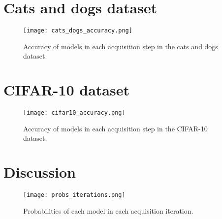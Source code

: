 \section{Cats and dogs dataset}


\begin{figure}[H]
    \centering
    \texttt{[image: cats\_dogs\_accuracy.png]}
    \caption{Accuracy of models in each acquisition step in the cats and dogs dataset.}
    \label{fig:cats_dogs_comparison_active_learning_random}
\end{figure}


\section{CIFAR-10 dataset}

\begin{figure}[H]
    \centering
    \texttt{[image: cifar10\_accuracy.png]}
    \caption{Accuracy of models in each acquisition step in the CIFAR-10 dataset.}
    \label{fig:cifar10_comparison_active_learning_random}
\end{figure}

\section{Discussion}

\begin{figure}[H]
    \centering
    \texttt{[image: probs\_iterations.png]}
    \caption{Probabilities of each model in each acquisition iteration.}
    \label{fig:probs_iterations}
\end{figure}
